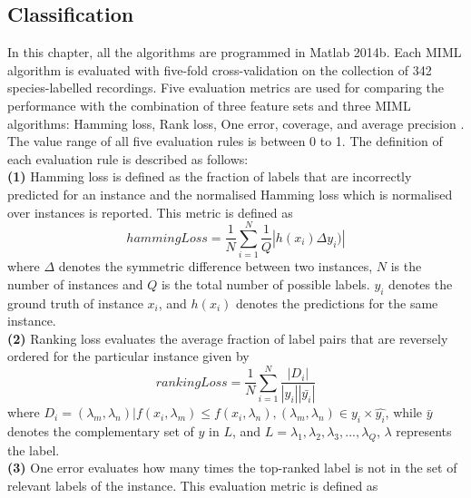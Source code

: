 \subsection{Classification}

\label{ch6:eveluationMetric}
In this chapter, all the algorithms are programmed in Matlab 2014b. Each MIML algorithm is evaluated with five-fold cross-validation on the collection of 342 species-labelled recordings. 
Five evaluation metrics are used for comparing the performance with the combination of three feature sets and three MIML algorithms: Hamming loss, Rank loss, One error, coverage, and  average precision \citep{Madjarov20123084, zhou2008miml}. The value range of all five evaluation rules is between 0 to 1. The definition of each evaluation rule is described as follows:
\\
\textbf{(1)} Hamming loss is defined as the fraction of labels that are incorrectly predicted for an instance and the normalised Hamming loss which is normalised over instances is reported. This metric is defined as
\begin{equation}
hammingLoss = \frac{1}{N}\sum_{i=1}^{N}\frac{1}{Q}|h(x_{i})\Delta y_{i})|
\end{equation}
where $\Delta$ denotes the symmetric difference between two instances, $N$ is the number of instances and $Q$ is the total number of possible labels. $y_{i}$ denotes the ground truth of instance $x_{i}$, and $h(x_{i})$ denotes the predictions for the same instance. 
\\
\textbf{(2)} Ranking loss evaluates the average fraction of label pairs that are reversely ordered for the particular instance given by
\begin{equation}
rankingLoss = \frac{1}{N}\sum_{i=1}^{N}\frac{|D_{i}|}{|y_{i}||\bar{y_{i}}|}
\end{equation}
where $D_{i}={(\lambda_{m},\lambda_{n})| f(x_{i}, \lambda_{m}) \leq f(x_{i}, \lambda_{n}), (\lambda_{m}, \lambda_{n}) \in y_{i} \times \hat{y_{i}}}$,
while $\bar{y}$ denotes the complementary set of $y$ in $L$, and $L={\lambda_{1}, \lambda_{2}, \lambda_{3},..., \lambda_{Q}}$, $\lambda$ represents the label.
\\
\textbf{(3)} One error evaluates how many times the top-ranked label is
not in the set of relevant labels of the instance. This evaluation metric is defined as

